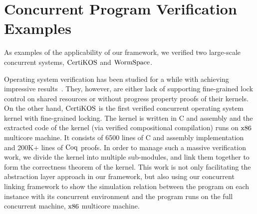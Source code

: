 %
%
%
%
%
%
%
%
%
%
%
%



\section{Concurrent Program Verification Examples}
\label{chapter:introduction:sec:concurrent-program-verification-examples}


As examples of the applicability of our framework,
we verified two large-scale concurrent systems, $\mathrm{CertiKOS}$ and $\mathrm{WormSpace}$.

Operating system verification has been studied for a while 
with achieving impressive results~\cite{klein2009sel4, xu16, hawblitzel10}.
They, however,  are either lack of supporting fine-grained lock control on shared resources or without progress property proofs of their kernels.
On the other hand, $\mathrm{CertiKOS}$ is the first verified concurrent operating system kernel with fine-grained locking. 
The kernel is written in C and assembly and the extracted code of the kernel (via verified compositional compilation)
runs on  $\mathrm{x86}$ multicore machine. 
It consists of 6500 lines of C and
assembly implementation and 200K+ lines of $\mathrm{Coq}$ proofs.
In order to manage such a massive verification work, 
we  divide the kernel 
into multiple sub-modules, 
and link them together 
to form the correctness theorem of the kernel. 
This work is not only facilitating the abstraction layer approach 
in our framework, but also using our concurrent linking framework 
to show the simulation relation 
between the program on each instance with its concurrent environment 
and the program runs on the full concurrent machine, $\mathrm{x86}$ multicore machine. 

